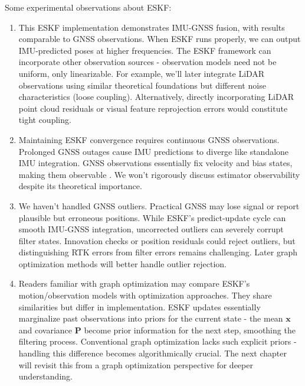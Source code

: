 Some experimental observations about ESKF:
\begin{enumerate}
\item This ESKF implementation demonstrates IMU-GNSS fusion, with results comparable to GNSS observations. When ESKF runs properly, we can output IMU-predicted poses at higher frequencies. The ESKF framework can incorporate other observation sources - observation models need not be uniform, only linearizable. For example, we'll later integrate LiDAR observations using similar theoretical foundations but different noise characteristics (loose coupling). Alternatively, directly incorporating LiDAR point cloud residuals or visual feature reprojection errors would constitute tight coupling.

\item Maintaining ESKF convergence requires continuous GNSS observations. Prolonged GNSS outages cause IMU predictions to diverge like standalone IMU integration. GNSS observations essentially fix velocity and bias states, making them observable \cite{Vidal-Calleja2007}. We won't rigorously discuss estimator observability despite its theoretical importance.

\item We haven't handled GNSS outliers. Practical GNSS may lose signal or report plausible but erroneous positions. While ESKF's predict-update cycle can smooth IMU-GNSS integration, uncorrected outliers can severely corrupt filter states. Innovation checks or position residuals could reject outliers, but distinguishing RTK errors from filter errors remains challenging. Later graph optimization methods will better handle outlier rejection.

\item Readers familiar with graph optimization may compare ESKF's motion/observation models with optimization approaches. They share similarities but differ in implementation. ESKF updates essentially marginalize past observations into priors for the current state - the mean $\bm{x}$ and covariance $\bm{P}$ become prior information for the next step, smoothing the filtering process. Conventional graph optimization lacks such explicit priors - handling this difference becomes algorithmically crucial. The next chapter will revisit this from a graph optimization perspective for deeper understanding.
\end{enumerate}

